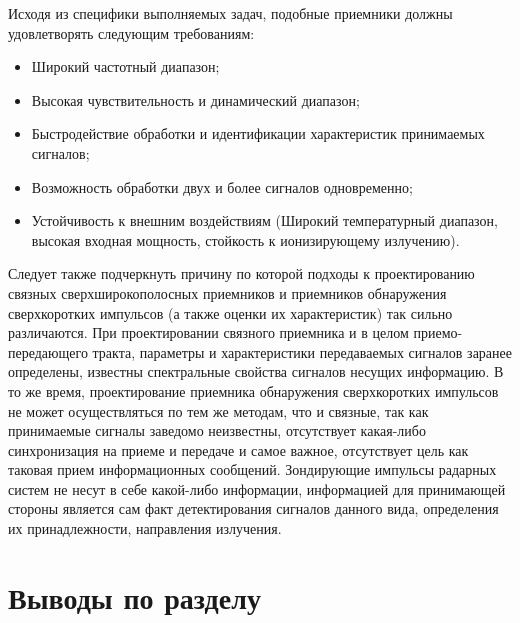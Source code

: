 Исходя из специфики выполняемых задач, подобные приемники должны удовлетворять следующим требованиям:
\begin{itemize}
\item Широкий частотный диапазон;

\item Высокая чувствительность и динамический диапазон;

\item Быстродействие обработки и идентификации характеристик принимаемых сигналов;

\item Возможность обработки двух и более сигналов одновременно;

\item Устойчивость к внешним воздействиям (Широкий температурный диапазон, высокая входная мощность, стойкость к ионизирующему излучению).
\end{itemize}

 Следует также подчеркнуть причину по которой подходы к проектированию связных сверхширокополосных приемников и приемников обнаружения сверхкоротких импульсов (а также оценки их характеристик) так сильно различаются. При проектировании связного приемника и в целом приемо-передающего тракта, параметры и характеристики передаваемых сигналов заранее определены, известны спектральные свойства сигналов несущих информацию.
 В то же время, проектирование приемника обнаружения сверхкоротких импульсов не может осуществляться по тем же методам, что и связные, так как принимаемые сигналы заведомо неизвестны, отсутствует какая-либо синхронизация на приеме и передаче и самое важное, отсутствует цель как таковая прием информационных сообщений. Зондирующие импульсы радарных систем не несут в себе какой-либо информации, информацией для принимающей стороны является сам факт детектирования сигналов данного вида, определения их принадлежности, направления излучения.

\section{Выводы по разделу}